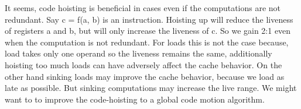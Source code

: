\begin{section}
It seems, code hoisting is beneficial in cases even if the computations are not redundant.
Say c = f(a, b) is an instruction. Hoisting up will reduce the liveness of registers a and b, but will only increase the liveness of c. So we gain 2:1 even when the computation is not redundant. For loads this is not the case because, load takes only one operand so the liveness remains the same, additionally hoisting too much loads can have adversely affect the cache behavior.
On the other hand sinking loads may improve the cache behavior, because we load as late as possible. But sinking computations may increase the live range.
We might want to to improve the code-hoisting to a global code motion algorithm.


\end{section}


